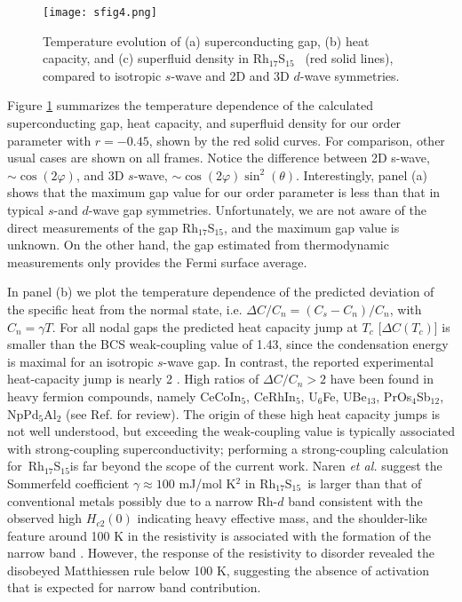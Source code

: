\documentclass[aps,pra,reprint,superscriptaddress,floatfix]{revtex4-2}
\newcommand{\rhs}{Rh$_{17}$S$_{15}$}
\begin{document}
\begin{figure}
\texttt{[image: sfig4.png]}%
\caption{\label{sfig4} Temperature evolution of (a) superconducting gap, (b) heat capacity, and (c) superfluid density in \rhs~ (red solid lines), compared to isotropic $s$-wave and  2D and 3D $d$-wave symmetries.}
\end{figure}
Figure \ref{sfig4} summarizes the temperature dependence of the calculated superconducting gap, heat capacity, and superfluid density for our order parameter with $r=-0.45$, shown by the red solid curves. For comparison, other usual cases are shown on all frames. Notice the difference between 2D s-wave, $\sim \cos({2\varphi})$, and 3D $s$-wave, $\sim \cos({2\varphi})\sin^2(\theta)$. Interestingly, panel (a) shows that the maximum gap value for our order parameter is less than that in typical $s$-and $d$-wave gap symmetries.  
Unfortunately, we are not aware of the direct measurements of the gap \rhs, and the maximum gap value is unknown. On the other hand, the gap estimated from thermodynamic measurements only provides the Fermi surface average.

In panel (b) we plot the temperature dependence of the predicted deviation of the specific heat from the normal state, i.e. $\Delta C/C_n = (C_s - C_n)/C_n$, with $C_n=\gamma T$. For all nodal gaps the predicted heat capacity jump at $T_c$ [$\Delta C(T_c)$] is smaller than the BCS weak-coupling value of 1.43, since the condensation energy is maximal for an isotropic $s$-wave gap. In contrast, the reported experimental heat-capacity jump is nearly 2 \cite{Naren2008}.
High ratios of $\Delta C/C_n > 2$ have been found in heavy fermion compounds, namely CeCoIn$_5$, CeRhIn$_5$, U$_6$Fe, UBe$_{13}$, PrOs$_4$Sb$_{12}$, NpPd$_5$Al$_2$ (see Ref. \cite{White2015} for review). The origin of these high heat capacity jumps is not well understood, but exceeding the weak-coupling value is typically associated with strong-coupling superconductivity; performing a strong-coupling calculation for~\rhs is far beyond the scope of the current work.
Naren {\it et al.} suggest the Sommerfeld coefficient $\gamma\approx 100$ mJ/mol K$^2$ in \rhs~is larger than that of conventional metals possibly due to a narrow Rh-$d$ band 
{consistent with the observed high $H_{c2}(0)$ indicating heavy effective mass}, 
and the shoulder-like feature around 100 K in the resistivity is associated with the formation of the narrow band \cite{Naren2008}. However, the response of the resistivity to disorder revealed the disobeyed Matthiessen rule below 100 K, suggesting the absence of activation that is expected for narrow band contribution.
\end{document}
